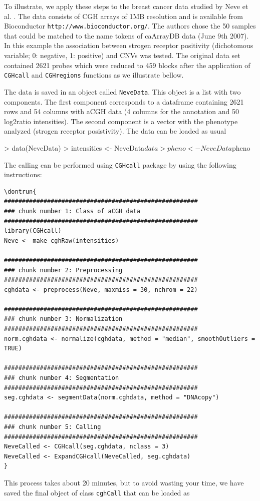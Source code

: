 \documentclass[11pt]{article}
\begin{document}
To illustrate, we apply these steps to the breast cancer data studied by Neve et al. \cite{NevChiFri06}. The data consists of CGH arrays of 
1MB resolution and is available from Bioconductor {\tt http://www.bioconductor.org/}. The authors chose the 50 samples that could 
be matched to the name tokens of caArrayDB data (June 9th 2007). In this example the association between strogen receptor positivity 
(dichotomous variable; 0: negative, 1: positive) and CNVs was tested. The original data set contained 2621 probes which were reduced 
to 459 blocks after the application of {\tt CGHcall} and {\tt CGHregions} functions as we illustrate bellow.

The data is saved in an object called {\tt NeveData}.  This object is a list with two components. The first component corresponds to 
a dataframe containing 2621 rows and 54 columns with aCGH data (4 columns for the annotation and 50 log2ratio intensities). 
The second component is a vector with the phenotype analyzed (strogen receptor posistivity). The data can be loaded as usual

\begin{Schunk}
\begin{Sinput}
> data(NeveData)
> intensities <- NeveData$data
> pheno <- NeveData$pheno
\end{Sinput}
\end{Schunk}

%
The calling can be performed using {\tt CGHcall} package by using the following instructions:
%
\begin{verbatim}
\dontrun{
######################################################
### chunk number 1: Class of aCGH data
######################################################
library(CGHcall)
Neve <- make_cghRaw(intensities)

######################################################
### chunk number 2: Preprocessing
######################################################
cghdata <- preprocess(Neve, maxmiss = 30, nchrom = 22)

######################################################
### chunk number 3: Normalization
######################################################
norm.cghdata <- normalize(cghdata, method = "median", smoothOutliers = TRUE)

######################################################
### chunk number 4: Segmentation
######################################################
seg.cghdata <- segmentData(norm.cghdata, method = "DNAcopy")

######################################################
### chunk number 5: Calling
######################################################
NeveCalled <- CGHcall(seg.cghdata, nclass = 3)
NeveCalled <- ExpandCGHcall(NeveCalled, seg.cghdata)
}
\end{verbatim}
%
This process takes about 20 minutes, but to avoid wasting your time, we have saved the final object of class {\tt cghCall} that can be loaded as
%
\end{document}
